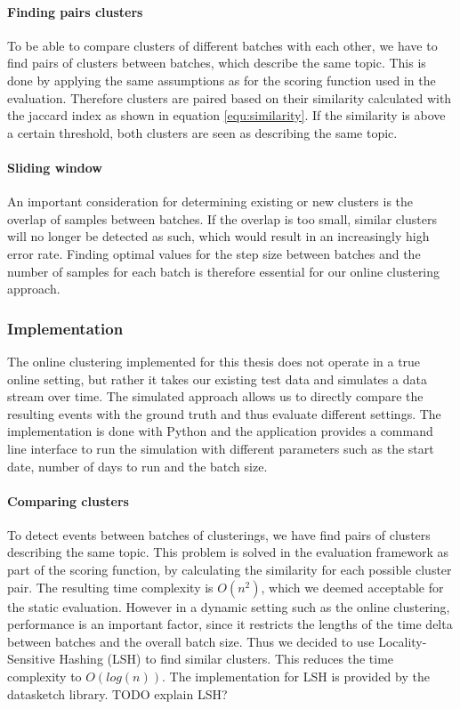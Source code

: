 \paragraph{Finding pairs clusters}

To be able to compare clusters of different batches with each other, we have to find pairs of clusters between batches, which describe the same topic. This is done by applying the same assumptions as for the scoring function used in the evaluation. Therefore clusters are paired based on their similarity calculated with the jaccard index as shown in equation \ref{equ:similarity}. If the similarity is above a certain threshold, both clusters are seen as describing the same topic.

\paragraph{Sliding window}

An important consideration for determining existing or new clusters is the overlap of samples between batches. If the overlap is too small, similar clusters will no longer be detected as such, which would result in an increasingly high error rate. Finding optimal values for the step size between batches and the number of samples for each batch is therefore essential for our online clustering approach.

\subsubsection{Implementation}

The online clustering implemented for this thesis does not operate in a true online setting, but rather it takes our existing test data and simulates a data stream over time. The simulated approach allows us to directly compare the resulting events with the ground truth and thus evaluate different settings. The implementation is done with Python and the application provides a command line interface to run the simulation with different parameters such as the start date, number of days to run and the batch size.

\paragraph{Comparing clusters} To detect events between batches of clusterings, we have find pairs of clusters describing the same topic. This problem is solved in the evaluation framework as part of the scoring function, by calculating the similarity for each possible cluster pair. The resulting time complexity is $O(n^2)$, which we deemed acceptable for the static evaluation. However in a dynamic setting such as the online clustering, performance is an important factor, since it restricts the lengths of the time delta between batches and the overall batch size. Thus we decided to use Locality-Sensitive Hashing (LSH)\cite{alex2015practical} to find similar clusters. This reduces the time complexity to $O(log(n))$. The implementation for LSH is provided by the datasketch library\cite{eric_zhu_2017_290602}. TODO explain LSH?


